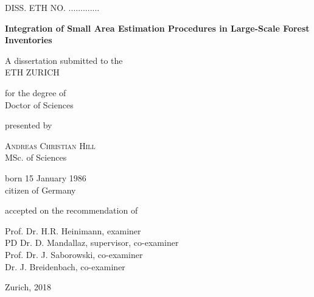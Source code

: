 

\begin{titlepage}

\begin{center}

\textsc{DISS. ETH NO. .............}

\vspace*{2cm}
\Large
\textbf{Integration of Small Area Estimation Procedures in Large-Scale Forest Inventories} %

\vspace*{1cm}
A dissertation submitted to the \\
ETH ZURICH

\vspace*{1cm}
for the degree of \\
Doctor of Sciences

\vspace*{1cm}
presented by

\vspace*{0.5cm}
\textsc{Andreas Christian Hill} \\
MSc. of Sciences

\vspace*{0.5cm}
born 15 January 1986 \\
citizen of Germany

\vspace*{1cm}
accepted on the recommendation of

\vspace*{0.2cm}
Prof. Dr. H.R. Heinimann, examiner\\
PD Dr. D. Mandallaz, supervisor, co-examiner\\
Prof. Dr. J. Saborowski, co-examiner\\
Dr. J. Breidenbach, co-examiner

\vspace{3cm}
Zurich, 2018


\end{center}

\end{titlepage}